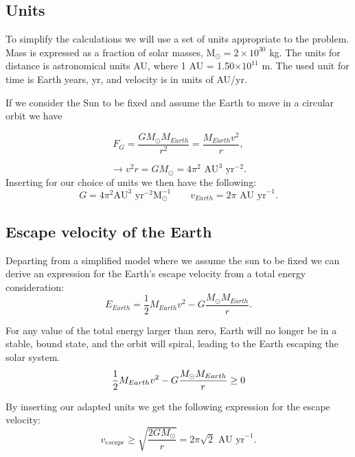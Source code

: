 \documentclass[a4paper]{article}
\begin{document}
\subsection{Units}
To simplify the calculations we will use a set of units appropriate to the problem. Mass is expressed as a fraction of solar masses, M$_{\odot} = 2\times10^{30}$ kg. The units for distance is astronomical units AU, where 1 AU = 1.50$\times10^{11}$ m. The used unit for time is Earth years, yr, and velocity is in units of AU/yr.

If we consider the Sun to be fixed and assume the Earth to move in a circular orbit we have

\begin{equation}
\label{eq:earthandsun}
F_G = \frac{GM_{\odot}M_{Earth}}{r^2}= \frac{M_{Earth}v^2}{r},
\end{equation}

\begin{equation}
\rightarrow v^2r=GM_{\odot}=4\pi^2\text{ AU}^3\text{ yr}^{-2}.
\end{equation}
Inserting for our choice of units we then have the following:
\begin{equation}
G=4\pi^2\text{AU}^3\text{ yr}^{-2}\text{M}_{\odot}^{-1} \quad\quad v_{Earth}=2\pi \text{ AU yr}^{-1}.
\end{equation}

\subsection{Escape velocity of the Earth}
\label{escapeE}
Departing from a simplified model where we assume the sun to be fixed we can derive an expression for the Earth's escape velocity from a total energy consideration:
\begin{equation}
E_{Earth} = \frac{1}{2}M_{Earth}v^2 -G\frac{M_\odot M_{Earth}}{r}.
\end{equation}

For any value of the total energy larger than zero, Earth will no longer be in a stable, bound state, and the orbit will spiral, leading to the Earth escaping the solar system.
\begin{equation}
\frac{1}{2}M_{Earth}v^2 -G\frac{M_\odot M_{Earth}}{r} \geq 0\\
\end{equation}

By inserting our adapted units we get the following expression for the escape velocity:
\begin{equation}
v_{escape} \geq \sqrt{\frac{2GM_{\odot}}{r}} =2\pi\sqrt{2}\text{ AU yr}^{-1}.
\end{equation}
\end{document}
